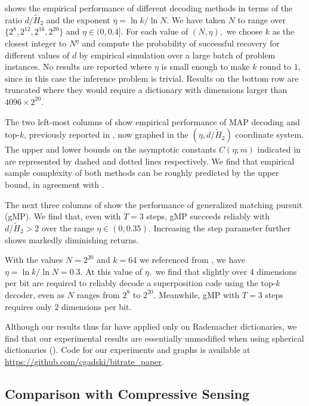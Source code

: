  shows the empirical performance of different decoding methods in terms of the ratio $d/\tilde H_2$ and the exponent $\eta = \ln k / \ln N.$ We have taken $N$ to range over $\{2^8, 2^{12}, 2^{16}, 2^{20} \}$ and $\eta \in (0, 0.4].$ For each value of $(N, \eta),$ we choose $k$ as the closest integer to $N^\eta$ and compute the probability of successful recovery for different values of $d$ by empirical simulation over a large batch of problem instances. No results are reported where $\eta$ is small enough to make $k$ round to $1,$ since in this case the inference problem is trivial. Results on the bottom row are truncated where they would require a dictionary with dimensions larger than $4096 \times 2^{20}.$

The two left-most columns of  show empirical performance of MAP decoding and top-$k$, previously reported in , now graphed in the $(\eta, d/\tilde H_2)$ coordinate system. The upper and lower bounds on the asymptotic constants $C(\eta; m)$ indicated in  are represented by dashed and dotted lines respectively. We find that empirical sample complexity of both methods can be roughly predicted by the upper bound, in agreement with .

The next three columns of  show the performance of generalized matching pursuit (gMP). We find that, even with $T = 3$ steps, gMP succeeds reliably with $d/\tilde H_2 > 2$ over the range $\eta \in (0, 0.35).$ Increasing the step parameter further shows markedly diminishing returns.

With the values $N = 2^{20}$ and $k = 64$ we referenced from \citet{gao_scaling_2024}, we have $\eta = \ln k / \ln N = 0.3.$ At this value of $\eta,$ we find that slightly over 4 dimensions per bit are required to reliably decode a superposition code using the top-$k$ decoder, even as $N$ ranges from $2^8$ to $2^{20}$. Meanwhile, gMP with $T = 3$ steps requires only $2$ dimensions per bit.

Although our results thus far have applied only on Rademacher dictionaries, we find that our experimental results are essentially unmodified when using spherical dictionaries (). Code for our experiments and graphs is available at \url{https://github.com/cgadski/bitrate_paper}.

\subsection{Comparison with Compressive Sensing} \label{sec:compress}

